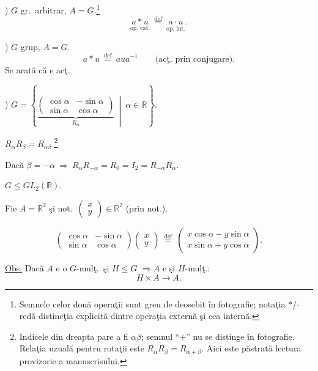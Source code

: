 \bigskip
{}) $G$ gr.\ arbitrar, $A=G$.\footnote{Semnele celor două operaţii sunt greu de deosebit în fotografie; notaţia $*$/$\cdot$ redă distincţia explicită dintre operaţia externă şi cea internă.}
\[
\underset{\text{op. ext.}}{a*u}
\ \overset{\mathrm{def}}{=}\
\underset{\text{op. int.}}{a\cdot u}.
\]

\bigskip
{}) $G$ grup, $A=G$.
\[
a*u\ \overset{\mathrm{def}}{=}\ aua^{-1}
\qquad\text{(acţ. prin conjugare)}.
\]
\noindent Se arată că e acţ.

\bigskip
{}) $G=\left\{
\underbrace{\begin{pmatrix}
\cos\alpha & -\sin\alpha\\
\sin\alpha & \cos\alpha
\end{pmatrix}}_{R_\alpha}
\ \middle|\ \alpha\in\mathbb{R}\right\}$.

\noindent $R_\alpha R_\beta=R_{\alpha\beta}$.\footnote{Indicele din dreapta pare a fi $\alpha\beta$; semnul ``$+$'' nu se distinge în fotografie. Relaţia uzuală pentru rotaţii este $R_\alpha R_\beta=R_{\alpha+\beta}$. Aici este păstrată lectura provizorie a manuscrisului.}

\bigskip
\noindent Dacă $\beta=-\alpha\ \Longrightarrow\
R_\alpha R_{-\alpha}=R_0=I_2=R_{-\alpha}R_\alpha$.

\bigskip
\noindent $G\leq GL_2(\mathbb{R})$.

\bigskip
\noindent Fie $A=\mathbb{R}^2$ şi not.\
$\begin{pmatrix}x\\y\end{pmatrix}\in\mathbb{R}^2$ (prin not.).

\[
\begin{pmatrix}
\cos\alpha & -\sin\alpha\\
\sin\alpha & \cos\alpha
\end{pmatrix}
\begin{pmatrix}x\\y\end{pmatrix}
\ \overset{\mathrm{def}}{=}\
\begin{pmatrix}
x\cos\alpha-y\sin\alpha\\
x\sin\alpha+y\cos\alpha
\end{pmatrix}.
\]

\bigskip
\noindent\underline{Obs.} Dacă $A$ e o $G$-mulţ.\ şi $H\leq G$
$\Longrightarrow A$ e şi $H$-mulţ.:
\[
H\times A\longrightarrow A.
\]


